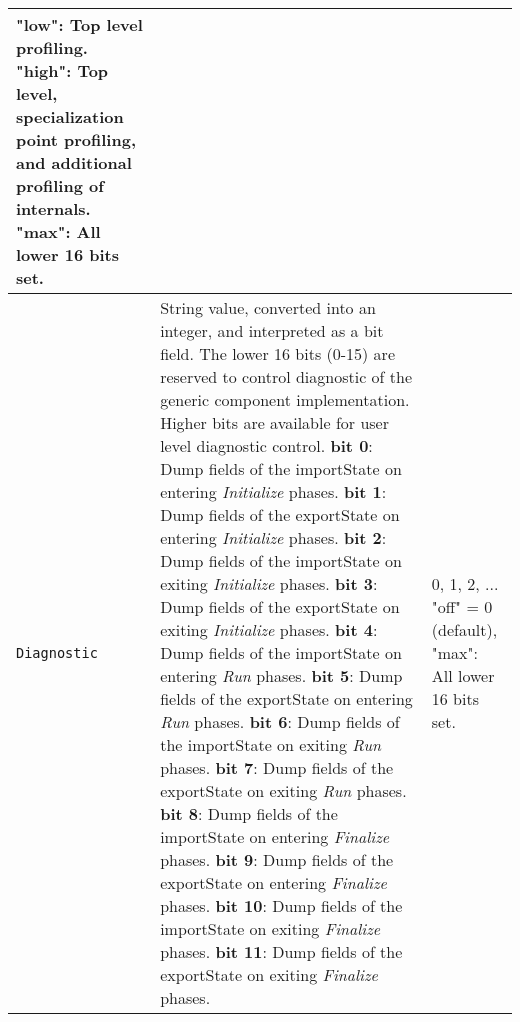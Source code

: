 \begin{longtable}{|p{}|p{}|p{}|}
                       "low": Top level profiling. \newline
                       "high": Top level, specialization point profiling, and additional profiling of internals. \newline
                       "max": All lower 16 bits set.\\ \hline
     {\tt Diagnostic} & String value, converted into an integer, and interpreted as a bit field. The lower 16 bits (0-15) are reserved to control diagnostic of the generic component implementation. Higher bits are available for user level diagnostic control. \newline
                       {\bf bit 0}: Dump fields of the importState on entering {\em Initialize} phases.\newline
                       {\bf bit 1}: Dump fields of the exportState on entering {\em Initialize} phases.\newline
                       {\bf bit 2}: Dump fields of the importState on exiting {\em Initialize} phases.\newline
                       {\bf bit 3}: Dump fields of the exportState on exiting {\em Initialize} phases.\newline
                       {\bf bit 4}: Dump fields of the importState on entering {\em Run} phases.\newline
                       {\bf bit 5}: Dump fields of the exportState on entering {\em Run} phases.\newline
                       {\bf bit 6}: Dump fields of the importState on exiting {\em Run} phases.\newline
                       {\bf bit 7}: Dump fields of the exportState on exiting {\em Run} phases.\newline
                       {\bf bit 8}: Dump fields of the importState on entering {\em Finalize} phases.\newline
                       {\bf bit 9}: Dump fields of the exportState on entering {\em Finalize} phases.\newline
                       {\bf bit 10}: Dump fields of the importState on exiting {\em Finalize} phases.\newline
                       {\bf bit 11}: Dump fields of the exportState on exiting {\em Finalize} phases.
                     & 0, 1, 2, ... \newline
                       "off" = 0 (default), \newline
                       "max": All lower 16 bits set.\\ \hline

\end{longtable}

